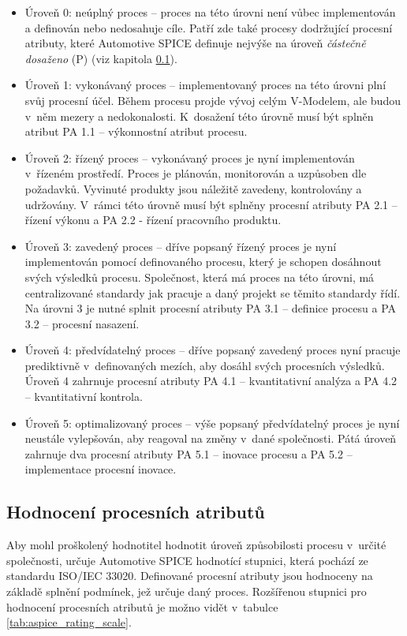 \documentclass[czech,master]{diploma}
\begin{document}
\begin{itemize}
\item Úroveň 0: neúplný proces -- proces na této úrovni není vůbec implementován a definován nebo nedosahuje cíle. Patří zde také procesy dodržující procesní atributy, které Automotive SPICE definuje nejvýše na úroveň \textit{částečně dosaženo} (P) (viz kapitola \ref{sec:process_atributes}).

\item Úroveň 1: vykonávaný proces -- implementovaný proces na této úrovni plní svůj procesní účel. Během procesu projde vývoj celým V-Modelem, ale budou v~něm mezery a nedokonalosti. K~dosažení této úrovně musí být splněn atribut PA 1.1 -- výkonnostní atribut procesu.

\item Úroveň 2: řízený proces -- vykonávaný proces je nyní implementován v~řízeném prostředí. Proces je plánován, monitorován a uzpůsoben dle požadavků. Vyvinuté produkty jsou náležitě zavedeny, kontrolovány a udržovány. V~rámci této úrovně musí být splněny procesní atributy PA 2.1 -- řízení výkonu a PA 2.2 - řízení pracovního produktu.

\item Úroveň 3: zavedený proces -- dříve popsaný řízený proces je nyní implementován pomocí definovaného procesu, který je schopen dosáhnout svých výsledků procesu. Společnost, která má proces na této úrovni, má centralizované standardy jak pracuje a daný projekt se těmito standardy řídí. Na úrovni 3 je nutné splnit procesní atributy PA 3.1 -- definice procesu a PA 3.2 -- procesní nasazení.

\item Úroveň 4: předvídatelný proces -- dříve popsaný zavedený proces nyní pracuje prediktivně v~definovaných mezích, aby dosáhl svých procesních výsledků. Úroveň 4 zahrnuje procesní atributy PA 4.1 -- kvantitativní analýza a PA 4.2 -- kvantitativní kontrola.

\item Úroveň 5: optimalizovaný proces -- výše popsaný předvídatelný proces je nyní neustále vylepšován, aby reagoval na změny v~dané společnosti. Pátá úroveň zahrnuje dva procesní atributy PA 5.1 -- inovace procesu a PA 5.2 -- implementace procesní inovace.

\end{itemize}

\subsection{Hodnocení procesních atributů}
\label{sec:process_atributes}
Aby mohl proškolený hodnotitel hodnotit úroveň způsobilosti procesu v~určité společnosti, určuje Automotive SPICE hodnotící stupnici, která pochází ze standardu ISO/IEC 33020. Definované procesní atributy jsou hodnoceny na základě splnění podmínek, jež určuje daný proces. Rozšířenou stupnici pro hodnocení procesních atributů je možno vidět v~tabulce \ref{tab:aspice_rating_scale}.
\end{document}
